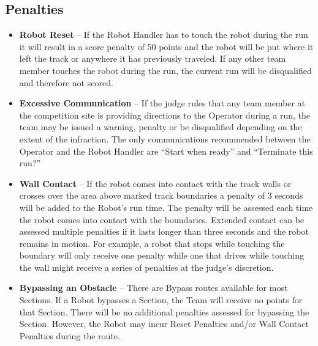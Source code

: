 \subsection{Penalties}
\begin{itemize}
\item \textbf{Robot Reset} – If the Robot Handler has to touch the robot during the run it will result in a score penalty of 50 points and the robot will be put where it left the track or anywhere it has previously traveled. If any other team member touches the robot during the run, the current run will be disqualified and therefore not scored.
\item \textbf{Excessive Communication} – If the judge rules that any team member at the competition site is providing directions to the Operator during a run, the team may be issued a warning, penalty or be disqualified depending on the extent of the infraction. The only communications recommended between the Operator and the Robot Handler are “Start when ready” and “Terminate this run?” 
\item \textbf{Wall Contact} – If the robot comes into contact with the track walls or crosses over the area above marked track boundaries a penalty of 3 seconds will be added to the Robot's run time. The penalty will be assessed each time the robot comes into contact with the boundaries. Extended contact can be assessed multiple penalties if it lasts longer than three seconds and the robot remains in motion. For example, a robot that stops while touching the boundary will only receive one penalty while one that drives while touching the wall might receive a series of penalties at the judge’s discretion.
\item \textbf{Bypassing an Obstacle}\label{bypass} -- There are Bypass routes available for most Sections. If a Robot bypasses a Section, the Team will receive no points for that Section. There will be no additional penalties assessed for bypassing the Section. However, the Robot may incur Reset Penalties and/or Wall Contact Penalties during the route.  
\end{itemize}



